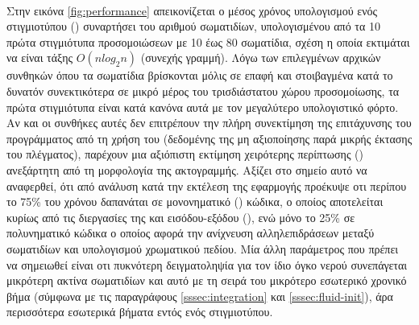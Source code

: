 \paragraph{} Στην εικόνα \ref{fig:performance} απεικονίζεται ο μέσος χρόνος υπολογισμού
ενός στιγμιοτύπου () συναρτήσει του αριθμού σωματιδίων, υπολογισμένου από τα 10
πρώτα στιγμιότυπα προσομοιώσεων με 10 έως 80 σωματίδια, σχέση η οποία
εκτιμάται να είναι τάξης $O(n log_2n)$ (συνεχής γραμμή). Λόγω των επιλεγμένων αρχικών
συνθηκών όπου τα σωματίδια βρίσκονται μόλις σε επαφή και στοιβαγμένα κατά το δυνατόν
συνεκτικότερα σε μικρό μέρος του τρισδιάστατου χώρου προσομοίωσης, τα πρώτα στιγμιότυπα
είναι κατά κανόνα αυτά με τον μεγαλύτερο υπολογιστικό φόρτο. Αν και οι συνθήκες αυτές δεν
επιτρέπουν την πλήρη συνεκτίμηση της επιτάχυνσης του προγράμματος από τη χρήση του  (δεδομένης της μη αξιοποίησης παρά μικρής έκτασης του πλέγματος), παρέχουν μια
αξιόπιστη εκτίμηση χειρότερης περίπτωσης () ανεξάρτητη από τη μορφολογία
της ακτογραμμής. Αξίζει στο σημείο αυτό να αναφερθεί, ότι από ανάλυση κατά την εκτέλεση
της εφαρμογής προέκυψε οτι περίπου το 75\% του χρόνου δαπανάται σε μονονηματικό
() κώδικα, ο οποίος αποτελείται κυρίως από τις διεργασίες της
 και εισόδου-εξόδου (), ενώ μόνο το 25\% σε πολυνηματικό κώδικα ο
οποίος αφορά την ανίχνευση αλληλεπιδράσεων μεταξύ σωματιδίων και υπολογισμού χρωματικού
πεδίου. Μία άλλη παράμετρος που πρέπει να σημειωθεί είναι οτι πυκνότερη δειγματοληψία για
τον ίδιο όγκο νερού συνεπάγεται μικρότερη ακτίνα σωματιδίων και αυτό με τη σειρά του
μικρότερο εσωτερικό χρονικό βήμα (σύμφωνα με τις παραγράφους \ref{sssec:integration} και
\ref{sssec:fluid-init}), άρα περισσότερα εσωτερικά βήματα εντός ενός στιγμιοτύπου.

